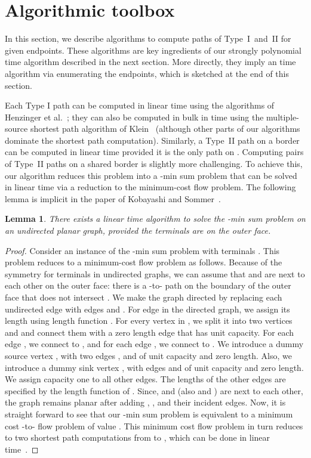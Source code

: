 \documentclass[11pt,twoside]{article}
\newtheorem{lemma}[theorem]{Lemma}
\begin{document}
\section{Algorithmic toolbox} 

In this section, we describe algorithms to compute paths of Type~I~and~II for given endpoints.
These algorithms are key ingredients of our strongly polynomial time algorithm described in the next section.
More directly, they imply an  time algorithm via enumerating the endpoints, which is sketched at the end of this section.

Each Type I path can be computed in linear time using the algorithms of Henzinger et al.~\cite{henzinger1997planarShortestPaths}; they can also be computed in bulk in  time using the multiple-source shortest path algorithm of Klein~\cite{klein2005multiSourceShPaths} (although other parts of our algorithms dominate the shortest path computation).
Similarly, a Type~II path on a border  can be computed in linear time provided it is the only path on .
Computing pairs of Type~II paths on a shared border is slightly more challenging.  
To achieve this, our algorithm reduces this problem into a -min sum problem that can be solved in linear time via a reduction to the minimum-cost flow problem.  
The following lemma is implicit in the paper of Kobayashi and Sommer~\cite{kobayashi2010shortest}. 

\begin{lemma}
\label{lem:2minSum}
There exists a linear time algorithm to solve the -min sum problem on an undirected planar graph, provided the terminals are on the outer face.
\end{lemma}
\begin{proof}
Consider an instance of the -min sum problem with terminals . This problem reduces to a minimum-cost flow problem as follows.
Because of the symmetry for terminals in undirected graphs, we can assume that  and  are next to each other on the outer face:  there is a -to- path on the boundary of the outer face that does not intersect . We make the graph directed by replacing each undirected edge  with edges  and . For edge  in the directed graph, we assign its length using length function . For every vertex  in , we split it into two vertices  and  and connect them with a zero length edge that has unit capacity. For each edge , we connect  to , and for each edge , we connect  to . We introduce a dummy source vertex , with two edges , and  of unit capacity and zero length.  Also, we introduce a dummy sink vertex , with edges  and  of unit capacity and zero length.  We assign capacity one to all other edges.  The lengths of the other edges are specified by the length function  of . Since,  and  (also  and ) are next to each other, the graph remains planar after adding , , and their incident edges.
Now, it is straight forward to see that our -min sum problem is equivalent to a minimum cost -to- flow problem of value .
This minimum cost flow problem in turn reduces to two shortest path computations from  to , which can be done in linear time~\cite{henzinger1997planarShortestPaths}.
\end{proof}
\end{document}
